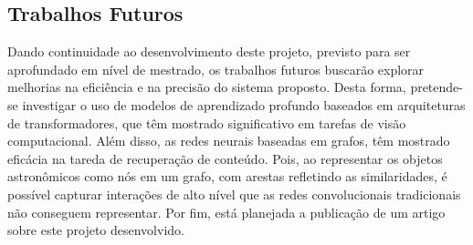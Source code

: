 \subsection{Trabalhos Futuros}
Dando continuidade ao desenvolvimento deste projeto, previsto para ser aprofundado em nível de mestrado, os trabalhos futuros buscarão explorar melhorias na eficiência e na precisão do sistema proposto. Desta forma, pretende-se investigar o uso de modelos de aprendizado profundo baseados em arquiteturas de transformadores, que têm mostrado significativo em tarefas de visão computacional.  Além disso, as redes neurais baseadas em grafos, têm mostrado eficácia na tareda de recuperação de conteúdo. Pois, ao representar os objetos astronômicos como nós em um grafo, com arestas refletindo as similaridades, é possível capturar interações de alto nível que as redes convolucionais tradicionais não conseguem representar. Por fim, está planejada a publicação de um artigo sobre este projeto desenvolvido.









